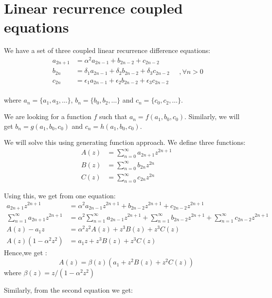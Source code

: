 \documentclass[11pt,a4paper]{article}
\begin{document}
\section{Linear recurrence coupled equations}
We have a set of three coupled linear recurrence difference equations:
\begin{equation}
\boxed{
\begin{aligned}
a_{2n+1}&= \alpha^2 a_{2n-1} + b_{2n-2} + c_{2n-2} \\
b_{2n}&= \delta_1 a_{2n-1} + \delta_2 b_{2n-2} + \delta_3 c_{2n-2} \\
c_{2n} &= \epsilon_1 a_{2n-1} + \epsilon_2 b_{2n-2} + \epsilon_3 c_{2n-2}\\
\end{aligned}}
\quad , \forall n >0
\end{equation}

where $a_n= \{a_1, a_3, \ldots\}$, $b_n= \{b_0, b_2, \ldots\}$ and $c_n= \{c_0, c_2, \ldots\}$.

We are looking for a function $f$ such that $a_n= f(a_1, b_0,c_0)$. Similarly, we will get $b_n= g(a_1, b_0,c_0)$ and $c_n= h(a_1, b_0,c_0)$.

We will solve this using generating function approach. We define three functions:
\begin{align}
A(z)&= \sum_{n=0}^{\infty} a_{2n+1}z^{2n+1}\\
 B(z)&= \sum_{n=0}^{\infty} b_{2n}z^{2n}\\
C(z)&= \sum_{n=0}^{\infty} c_{2n}z^{2n}
\end{align}


Using this, we get from one equation:
\begin{align}
a_{2n+1}  z^{2n+1}&= \alpha^2 a_{2n-1} z^{2n+1} + b_{2n-2} z^{2n+1} + c_{2n-2} z^{2n+1}\\
\sum_{n=1}^{\infty} a_{2n+1}  z^{2n+1}&= \alpha^2  \sum_{n=1}^{\infty} a_{2n-1} z^{2n+1} +  \sum_{n=1}^{\infty} b_{2n-2} z^{2n+1} +  \sum_{n=1}^{\infty}c_{2n-2} z^{2n+1}\\
A(z) -a_1 z &=\alpha^2  z^2 A(z) +  z^3 B(z) + z^3 C(z)\\
A(z)(1 -\alpha^2  z^2 )  &=  a_1 z +  z^3 B(z) + z^3 C(z)
\end{align}
Hence,we get :
\begin{equation}
\boxed{A(z) =  \beta(z) (a_1  +  z^2 B(z) + z^2 C(z))}
\end{equation}
where $\beta(z)= z/(1 -\alpha^2  z^2 )$

Similarly, from the second equation we get:
\end{document}
